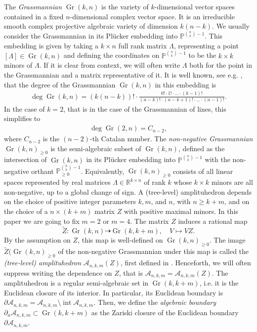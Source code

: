 \documentclass[12pt]{extarticle}
\theoremstyle{definition}
\theoremstyle{theorem}
\theoremstyle{remark}
\numberwithin{equation}{section}
\newcommand{\R}{\mathbb{R}}
\newcommand{\PP}{\mathbb{P}}
\newcommand{\wt}{\widetilde}
\DeclareMathOperator{\gr}{Gr}
\newcommand{\aA}{\mathcal{A}}
\newcommand{\open}{\operatorname{int}}
\begin{document}
The \emph{Grassmannian} $\gr(k,n)$ is the variety of $k$-dimensional vector spaces contained in a fixed $n$-dimensional complex vector space. It is an irreducible smooth complex projective algebraic variety of dimension $k(n-k)$. 
We usually consider the Grassmannian in its Pl\"ucker embedding into $\PP^{ \binom{n}{k}-1}$.
This embedding is given by taking a $k\times n$ full rank matrix $\Lambda$, representing a point $[\Lambda]\in \gr(k,n)$ and defining the coordinates on $\PP^{ \binom{n}{k}-1}$ to be the $k\times k$ minors of $\Lambda$.
If it is clear from context, we will often write $\Lambda$ both for the point in the Grassmannian and a matrix representative of it.
It is well known, see e.g. \cite[Corollary 2.33]{degGrkn}, that the degree of the Grassmannian $\gr(k,n)$ in this embedding is
\begin{align}\label{eq:Grkn_deg}
    \deg\gr(k,n)=(k(n-k))! \cdot 
        \frac{0! \cdot 1! \cdot \ldots \cdot (k-1)!}{(n-k)! \cdot (n-k+1)! \cdot \ldots \cdot (n-1)!}.
\end{align}
In the case of $k=2$, that is in the case of the Grassmannian of lines, this simplifies to 
\begin{align}\label{eq:Gr2_deg}
    \deg \gr(2,n)=C_{n-2},
\end{align}
where $C_{n-2}$ is the $(n-2)$-th Catalan number.
The \emph{non-negative Grassmannian} $\gr(k,n)_{\geq 0}$ \cite{postnikov} is the semi-algebraic subset of $\gr(k,n)$, defined as the intersection of $\gr(k,n)$ in its Pl\"ucker embedding into $\PP^{ \binom{n}{k}-1}$ with the non-negative orthant $\PP^{ \binom{n}{k}-1}_{\geq 0}$. 
Equivalently, $\gr(k,n)_{\geq 0}$ consists of all linear spaces represented by real matrices $\Lambda\in \R^{k\times n}$ of rank $k$ whose $k\times k$ minors are all non-negative, up to a global change of sign. 
A (tree-level) amplituhedron depends on the choice of positive integer parameters $k,m$, and $n$, with $n\geq k+m$, and on the choice of a $n\times (k+m)$ matrix $Z$ with positive maximal minors. In this paper we are going to fix $m=2$ or $m=4$. The matrix $Z$ induces a rational map
\[
\widetilde{Z}:\gr(k,n) \dashrightarrow \gr(k,k+m),\quad V\mapsto VZ.
\]
By the assumption on $Z$, this map is well-defined on $\gr(k,n)_{\geq 0}$. The image $\wt{Z}(\gr(k,n)_{\geq 0}$ of the non-negative Grassmannian under this map is called the \emph{(tree-level) amplituhedron} $\aA_{n,k,m}(Z)$, first defined in \cite{Amplituhedron}. 
Henceforth, we will often suppress writing the dependence on $Z$, that is $\aA_{n,k,m}=\aA_{n,k,m}(Z)$.
The amplituhedron is a regular semi-algebraic set in $\gr(k,k+m)$, i.e. it is the Euclidean closure of its interior. In particular, its Euclidean boundary is $\partial\aA_{n,k,m}=\aA_{n,k,m}\setminus\open \aA_{n,k,m}$.
Then, we define the \emph{algebraic boundary} $\partial_a\aA_{n,k,m}\subset\gr(k,k+m)$ as the Zariski closure of the Euclidean boundary $\partial\aA_{n,k,m}$.
\end{document}
